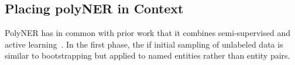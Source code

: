 \subsection{Placing polyNER in Context}
PolyNER has in common with prior work that it combines semi-supervised and active learning~\cite{nguyen2004active,basu2004active}.
In the first phase, the if initial sampling of unlabeled data is similar to bootstrapping but applied to named entities rather than entity pairs. 
